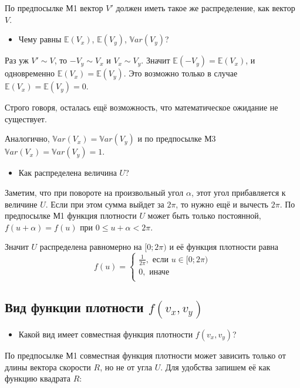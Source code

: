 \documentclass[11pt,russian,]{article}
\providecommand{\tightlist}{%
  \setlength{\itemsep}{0pt}\setlength{\parskip}{0pt}}
\newcommand{\E}{\mathbb{E}}
\newcommand{\Var}{\mathbb{V}ar}
\begin{document}
По предпосылке М1 вектор \(V'\) должен иметь такое же распределение, как
вектор \(V\).

\begin{itemize}
\tightlist
\item
  Чему равны \(\E(V_x)\), \(\E(V_y)\), \(\Var(V_y)\)?
\end{itemize}

Раз уж \(V' \sim V\), то \(-V_y \sim V_x\) и \(V_x \sim V_y\). Значит
\(\E(-V_y) = \E(V_x)\), и одновременно \(\E(V_x) = \E(V_y)\). Это
возможно только в случае \(\E(V_x) = \E(V_y) = 0\).

Строго говоря, осталась ещё возможность, что математическое ожидание не
существует.

Аналогично, \(\Var(V_x) = \Var(V_y)\) и по предпосылке М3
\(\Var(V_x) = \Var(V_y) = 1\).

\begin{itemize}
\tightlist
\item
  Как распределена величина \(U\)?
\end{itemize}

Заметим, что при повороте на произвольный угол \(\alpha\), этот угол
прибавляется к величине \(U\). Если при этом сумма выйдет за \(2\pi\),
то нужно ещё и вычесть \(2\pi\). По предпосылке М1 функция плотности
\(U\) может быть только постоянной, \(f(u+\alpha)=f(u)\) при
\(0\leq u +\alpha < 2\pi\).

Значит \(U\) распределена равномерно на \([0;2\pi)\) и её функция
плотности равна \[
f(u) = \begin{cases}
\frac{1}{2\pi}, \text{ если } u \in [0;2\pi) \\
0, \text{ иначе} \\
\end{cases}
\]

\subsection{\texorpdfstring{Вид функции плотности
\(f(v_x, v_y)\)}{Вид функции плотности f(v\_x, v\_y)}}\label{---fv_x-v_y}

\begin{itemize}
\tightlist
\item
  Какой вид имеет совместная функция плотности \(f(v_x, v_y)\)?
\end{itemize}

По предпосылке М1 совместная функция плотности может зависить только от
длины вектора скорости \(R\), но не от угла \(U\). Для удобства запишем
её как функцию квадрата \(R\):
\end{document}
